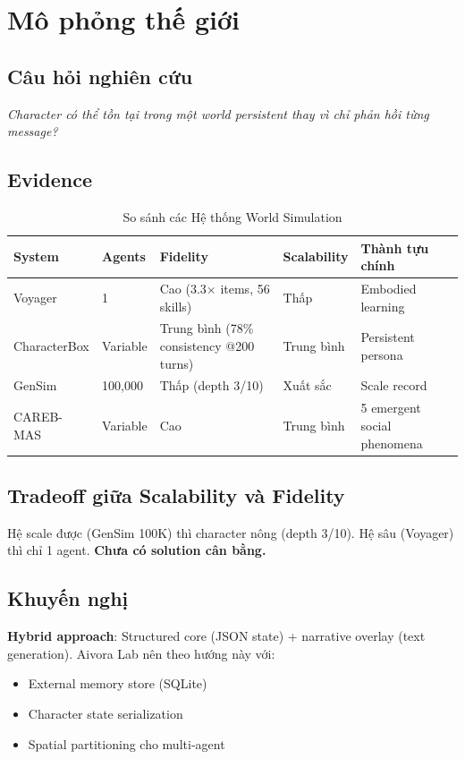\section{Mô phỏng thế giới}

\subsection{Câu hỏi nghiên cứu}

\textit{Character có thể tồn tại trong một world persistent thay vì chỉ phản hồi từng message?}

\subsection{Evidence}

\begin{table}[H]
\centering
\caption{So sánh các Hệ thống World Simulation}
\label{tab:world-sim}
\begin{tabular}{lllll}
\toprule
\textbf{System} & \textbf{Agents} & \textbf{Fidelity} & \textbf{Scalability} & \textbf{Thành tựu chính} \\
\midrule
Voyager & 1 & Cao (3.3$\times$ items, 56 skills) & Thấp & Embodied learning \\
CharacterBox & Variable & Trung bình (78\% consistency @200 turns) & Trung bình & Persistent persona \\
GenSim & 100,000 & Thấp (depth 3/10) & Xuất sắc & Scale record \\
CAREB-MAS & Variable & Cao & Trung bình & 5 emergent social phenomena \\
\bottomrule
\end{tabular}
\end{table}

\subsection{Tradeoff giữa Scalability và Fidelity}

Hệ scale được (GenSim 100K) thì character nông (depth 3/10). Hệ sâu (Voyager) thì chỉ 1 agent. \textbf{Chưa có solution cân bằng.}

\subsection{Khuyến nghị}

\textbf{Hybrid approach}: Structured core (JSON state) + narrative overlay (text generation). Aivora Lab nên theo hướng này với:
\begin{itemize}
    \item External memory store (SQLite)
    \item Character state serialization
    \item Spatial partitioning cho multi-agent
\end{itemize}

